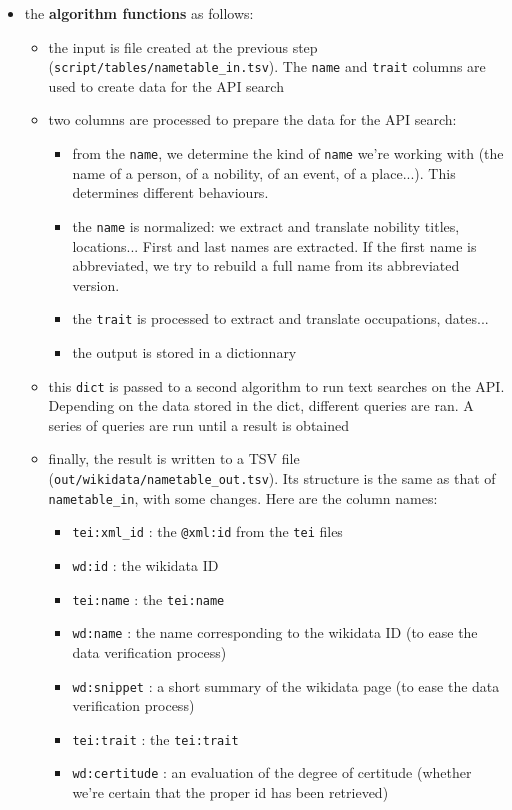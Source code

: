 \begin{itemize}
\item the \textbf{algorithm functions} as follows:
\begin{itemize} 
 \item the input is file created at the previous step (\texttt{script/tables/nametable\_in.tsv}). The \texttt{name} and \texttt{trait} columns are used to create data for the API search
\item two columns are processed to prepare the data for the API search:
\begin{itemize} 
 \item from the \texttt{name}, we determine the kind of \texttt{name} we're working with (the name of a person, of a nobility, of an event, of a place...). This determines different behaviours.
\item the \texttt{name} is normalized: we extract and translate nobility titles, locations... First and last names are extracted. If the first name is abbreviated, we try to rebuild a full name from its abbreviated version.
\item the \texttt{trait} is processed to extract and translate occupations, dates...
\item the output is stored in a dictionnary
\end{itemize}
\item this \texttt{dict} is passed to a second algorithm to run text searches on the API. Depending on the data stored in the dict, different queries are ran. A series of queries are run until a result is obtained
\item finally, the result is written to a TSV file (\texttt{out/wikidata/nametable\_out.tsv}). Its structure is the same as that of \texttt{nametable\_in}, with some changes. Here are the column names:
\begin{itemize} 
 \item \texttt{tei:xml\_id} : the \texttt{@xml:id} from the \texttt{tei} files
\item \texttt{wd:id} : the wikidata ID
\item \texttt{tei:name} : the \texttt{tei:name}
\item \texttt{wd:name} : the name corresponding to the wikidata ID (to ease the data verification process)
\item \texttt{wd:snippet} : a short summary of the wikidata page (to ease the data verification process)
\item \texttt{tei:trait} : the \texttt{tei:trait}
\item \texttt{wd:certitude} : an evaluation of the degree of certitude (whether we're certain that the proper id has been retrieved)

\end{itemize}
\end{itemize}
\end{itemize}
